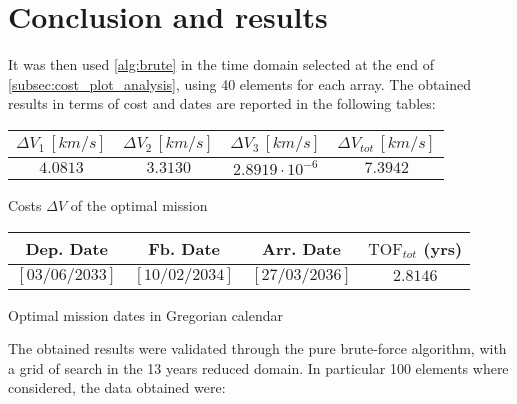 \vspace*{-0.3cm}
\section{Conclusion and results}
\label{sec:conclusion}

It was then used \autoref{alg:brute} in the time domain selected at the end of \autoref{subsec:cost_plot_analysis},  using 40 elements for each array. The obtained results in terms of cost and dates are reported in the following tables:

\vspace{0.3cm}

\begin{minipage}{0.5\linewidth}
    \centering
    \small
    \captionsetup{type=table}
    \begin{tabular}{|c|c|c|c|}
        \hline
        $\Delta V_1 \, [km/s]$ & $\Delta V_2 \, [km/s]$ & $\Delta V_3 \, [km/s]$ & $\Delta V_{tot} \, [km/s]$\\
        \hline
        $4.0813$ & $3.3130$ & $2.8919 \cdot 10^{-6}$ & $7.3942$\\
        \hline
    \end{tabular}
    \caption{Costs $\Delta V$ of the optimal mission}
    \label{table:cost_optimal}
\end{minipage}\hfill
\begin{minipage}{0.5\linewidth}
    \centering
    \small
    \captionsetup{type=table}
    \begin{tabular}{|c|c|c|c|}
        \hline
        Dep. Date & Fb. Date & Arr. Date & $\text{TOF}_{tot}$ (yrs) \\
        \hline
        $\left[03/06/2033 \right]$ & $\left[10/02/2034\right]$ & $\left[27/03/2036\right]$ & $2.8146$\\
        \hline
    \end{tabular}
    \caption{Optimal mission dates in Gregorian calendar}
    \label{table:date_optimal}
\end{minipage}
\vspace*{5pt}

The obtained results were validated through the pure brute-force algorithm, with a grid of search in the 13 years reduced domain. In particular 100 elements where considered, the data obtained were:

\vspace{0.2cm}

